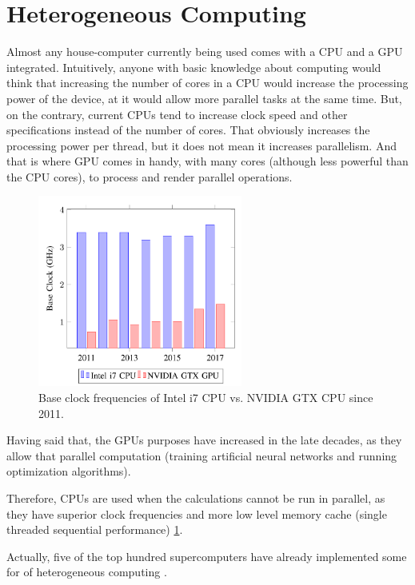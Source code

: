 \documentclass[10pt]{article}
\begin{document}
\section{Heterogeneous Computing}

Almost any house-computer currently being used comes with a CPU and a GPU
integrated. Intuitively, anyone with basic knowledge about computing would
think that increasing the number of cores in a CPU would increase the processing
power of the device, at it would allow more parallel tasks at the same time.
But, on the contrary, current CPUs tend to increase clock speed and other
specifications instead of the number of cores. That obviously increases
the processing power per thread, but it does not mean it increases parallelism.
And that is where GPU comes in handy, with many cores (although less powerful
than the CPU cores), to process and render parallel operations.

\begin{figure}[h!]
 \centering
 \includegraphics[width=0.6\textwidth]{comparativeCPU_GPU.png}
 \caption{Base clock frequencies of Intel i7 CPU vs. NVIDIA GTX CPU since 2011.
          \label{comparative}}
\end{figure}

Having said that, the GPUs purposes have increased in the late decades, as they
allow that parallel computation (training artificial neural networks and running
optimization algorithms).

Therefore, CPUs are used when the calculations cannot be run in parallel, as
they have superior clock frequencies and more low level memory cache (single
threaded sequential performance) \hyperref[comparative]{\ref{comparative}}.

Actually, five of the top hundred supercomputers have already implemented some
for of heterogeneous computing \cite{cashmere}. 
\end{document}
